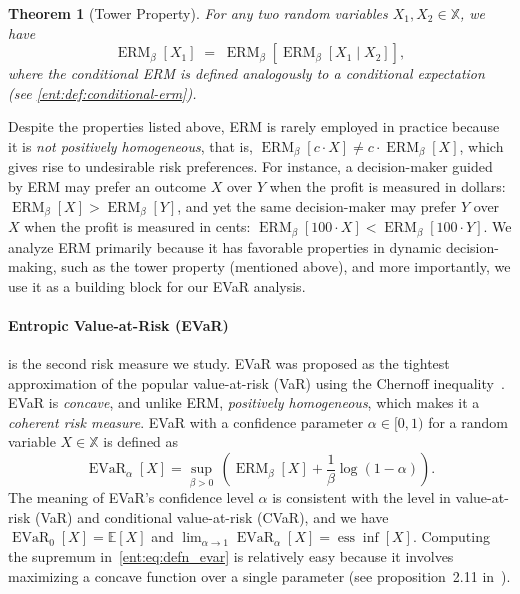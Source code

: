 \documentclass[twoside]{article}
\newcommand{\E}{\mathbb{E}}
\newcommand{\opt}{^\star}
\newcommand{\erm}[2]{\operatorname{ERM}_{#1}\left[#2\right]}
\newcommand{\evar}[2]{\operatorname{EVaR}_{#1} \left[#2\right]}
\theoremstyle{plain}
\newtheorem{theorem}{Theorem}[section]
\theoremstyle{definition}
\theoremstyle{remark}
\renewcommand{\cite}[1]{\citep{#1}}
\begin{document}
\begin{theorem}[Tower Property] \label{ent:thm:tower-erm}
For any two random variables $X_1,X_2\in\mathbb X$, we have
%
\[\erm{\beta}{X_1} \;=\; \erm{\beta}{\erm{\beta}{X_1 \mid X_2}},\]
%
where the conditional ERM is defined analogously to a conditional expectation (see  \cref{ent:def:conditional-erm}).
\end{theorem}

Despite the properties listed above, ERM is rarely employed in practice because it is \emph{not positively homogeneous}, that is, $\erm{\beta}{c\cdot X}\neq c\cdot\erm{\beta}{X}$, which gives rise to undesirable risk preferences. For instance, a decision-maker guided by ERM may prefer an outcome $X$ over $Y$ when the profit is measured in dollars: $\erm{\beta}{X} > \erm{\beta}{Y}$, and yet the same decision-maker may prefer $Y$ over $X$ when the profit is measured in cents: $\erm{\beta}{100 \cdot X} < \erm{\beta}{100 \cdot Y}$. We analyze ERM primarily because it has favorable properties in dynamic decision-making, such as the tower property (mentioned above), and more importantly, we use it as a building block for our EVaR analysis.


\paragraph{Entropic Value-at-Risk (EVaR)} is the second risk measure we study. EVaR was proposed as the tightest approximation of the popular value-at-risk (VaR) using the Chernoff inequality~\cite{Ahmadi-Javid2012}. EVaR is \emph{concave}, and unlike ERM, {\em positively homogeneous}, which makes it a \emph{coherent risk measure}. EVaR with a confidence parameter $\alpha\in [0,1)$ for a random variable $X \in \mathbb{X}$ is defined as~\cite{Follmer2016,Ahmadi-Javid2012}
%
\begin{equation} \label{ent:eq:defn_evar}
\evar{\alpha}{X} = \sup_{\beta > 0}\, \left(\erm{\beta}{X} + \frac{1}{\beta} \log(1-\alpha)\right).
\end{equation}
%
The meaning of EVaR's confidence level $\alpha$ is consistent with the level in value-at-risk (VaR) and conditional value-at-risk (CVaR), and we have $\evar{0}{X} = \E[X]$ and $\lim_{\alpha\rightarrow 1}\evar{\alpha}{X} = \operatorname{ess}\inf[X]$. Computing the supremum in~\eqref{ent:eq:defn_evar} is relatively easy because it involves maximizing a concave function over a single parameter (see proposition~2.11 in~\citealt{Ahmadi-Javid2017}).
\end{document}
